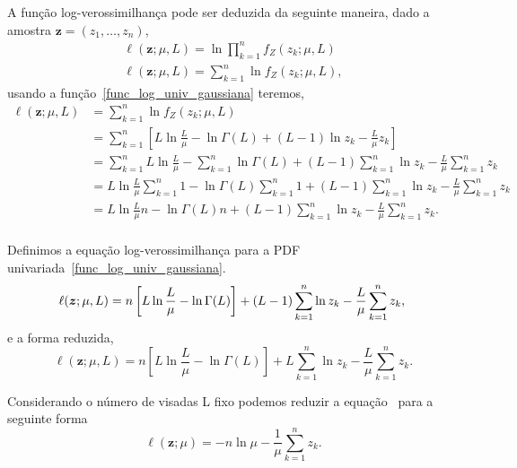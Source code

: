A função log-verossimilhança pode ser deduzida da seguinte maneira, dado a amostra $\bm z = (z_1,\dots,z_n)$, 
\begin{equation}\nonumber
\begin{split}
  \ell(\bm z;\mu, L)=\ln\prod_{k=1}^{n}f_Z(z_k;\mu,L)\\
  \ell(\bm z;\mu, L)=\sum_{k=1}^{n}\ln f_Z(z_k;\mu,L),
 \end{split}
 \end{equation}
usando a função~\eqref{func_log_univ_gaussiana} teremos,
\begin{equation}\nonumber
\begin{split}
    \ell(\bm z;\mu, L)&=\sum_{k=1}^{n}\ln f_Z(z_k;\mu,L)\\
                      &=\sum_{k=1}^{n}\left[L\ln\frac{L}{\mu}-\ln\Gamma(L)+(L-1)\ln z_k - \frac{L}{\mu} z_k\right]\\
                      &=\sum_{k=1}^{n}L\ln\frac{L}{\mu}-\sum_{k=1}^{n}\ln\Gamma(L)+(L-1)\sum_{k=1}^{n}\ln z_k - \frac{L}{\mu}\sum_{k=1}^{n} z_k\\
                      &=L\ln\frac{L}{\mu}\sum_{k=1}^{n}1-\ln\Gamma(L)\sum_{k=1}^{n}1+(L-1)\sum_{k=1}^{n}\ln z_k - \frac{L}{\mu}\sum_{k=1}^{n} z_k\\
                      &=L\ln\frac{L}{\mu}n-\ln\Gamma(L)n+(L-1)\sum_{k=1}^{n}\ln z_k - \frac{L}{\mu}\sum_{k=1}^{n} z_k.\\                
 \end{split}
 \end{equation}

Definimos a equação log-verossimilhança para a PDF univariada~\eqref{func_log_univ_gaussiana}.
\begin{equation}\nonumber
    \ell(\bm z;\mu, L)=n\left[L\ln\frac{L}{\mu}-\ln\Gamma(L)\right]+(L-1)\sum_{k=1}^{n}\ln z_k - \frac{L}{\mu}\sum_{k=1}^{n} z_k,\\                
 \end{equation}
e a forma reduzida, 
\begin{equation}
\ell(\bm z;\mu, L) = 
n \left[L\ln \frac{L}{\mu} - \ln \Gamma(L)\right]
+L \sum_{k=1}^{n}\ln z_k -\frac{L}{\mu}\sum_{k=1}^{n} z_k.
\label{eq:LogLikelihoodGamma_red}
\end{equation}

Considerando o número de visadas L fixo podemos reduzir a equação~ para a seguinte forma
\begin{equation}
\ell(\bm z;\mu) = 
-n\ln \mu -\frac{1}{\mu}\sum_{k=1}^{n} z_k.
\label{eq:LogLikelihoodGamma_red_L_fixo}
\end{equation}

